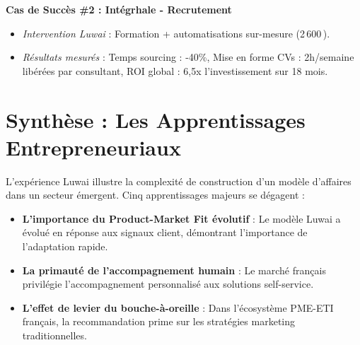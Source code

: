 \textbf{Cas de Succès \#2 : Intégrhale - Recrutement}
\begin{itemize}
    \item \emph{Intervention Luwai} : Formation + automatisations sur-mesure (2\,600\,\texteuro{}).
    \item \emph{Résultats mesurés} : Temps sourcing : -40\%, Mise en forme CVs : 2h/semaine libérées par consultant, ROI global : 6,5x l'investissement sur 18 mois.
\end{itemize}

\section{Synthèse : Les Apprentissages Entrepreneuriaux}

L'expérience Luwai illustre la complexité de construction d'un modèle d'affaires dans un secteur émergent. Cinq apprentissages majeurs se dégagent :

\begin{itemize}
    \item \textbf{L'importance du Product-Market Fit évolutif} : Le modèle Luwai a évolué en réponse aux signaux client, démontrant l'importance de l'adaptation rapide.
    \item \textbf{La primauté de l'accompagnement humain} : Le marché français privilégie l'accompagnement personnalisé aux solutions self-service.
    \item \textbf{L'effet de levier du bouche-à-oreille} : Dans l'écosystème PME-ETI français, la recommandation prime sur les stratégies marketing traditionnelles.
\end{itemize}
